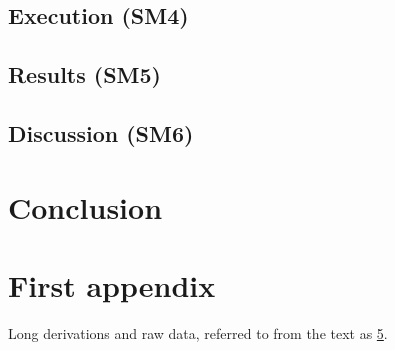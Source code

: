 \documentclass[a4paper, 11pt]{report}
\begin{document}
\section{Execution (SM4)}
\section{Results (SM5)}
\section{Discussion (SM6)}

\chapter{Conclusion}
\label{ch:conclusion}

\printbibliography[heading=bibintoc, title={References}]

\appendix
\chapter{First appendix}
\label{app:first}
Long derivations and raw data, referred to from the text as \cref{app:first}.

\makebackcover
\end{document}
